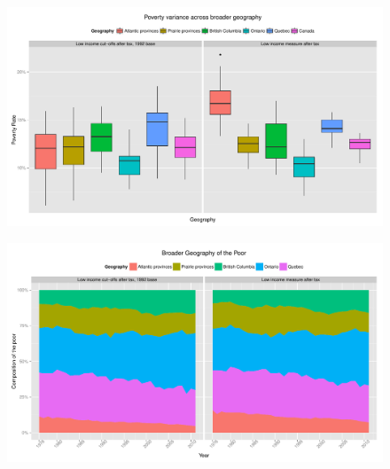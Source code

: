 \documentclass{article}\usepackage[]{graphicx}\usepackage[]{color}
\makeatletter
\def\maxwidth{ %
  \ifdim\Gin@nat@width>\linewidth
    \linewidth
  \else
    \Gin@nat@width
  \fi
}
\newenvironment{knitrout}{}{} %
\makeatother
\begin{document}
\begin{figure}[ht]
\begin{center}
\begin{knitrout}
\color{fgcolor}
\includegraphics[width=\maxwidth]{figure/unnamed-chunk-14} 

\end{knitrout}

\end{center}
\end{figure}
\begin{figure}[ht]
\begin{center}
\begin{knitrout}
\color{fgcolor}
\includegraphics[width=\maxwidth]{figure/unnamed-chunk-15} 

\end{knitrout}

\end{center}
\end{figure}
\end{document}
